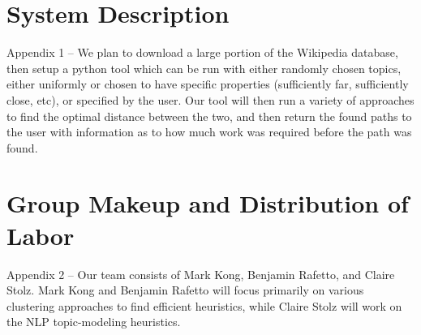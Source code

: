 \documentclass[11pt]{article}
\begin{document}
\appendix

\section{System Description}

 Appendix 1 – We plan to download a large portion of the Wikipedia database, then setup a python tool which can be run with either randomly chosen topics, either uniformly or chosen to have specific properties (sufficiently far, sufficiently close, etc), or specified by the user. Our tool will then run a variety of approaches to find the optimal distance between the two, and then return the found paths to the user with information as to how much work was required before the path was found.
  

\section{Group Makeup and Distribution of Labor}

 Appendix 2 – Our team consists of Mark Kong, Benjamin Rafetto, and Claire Stolz. Mark Kong and Benjamin Rafetto will focus primarily on various clustering approaches to find efficient heuristics, while Claire Stolz will work on the NLP topic-modeling heuristics.

 

\end{document}
